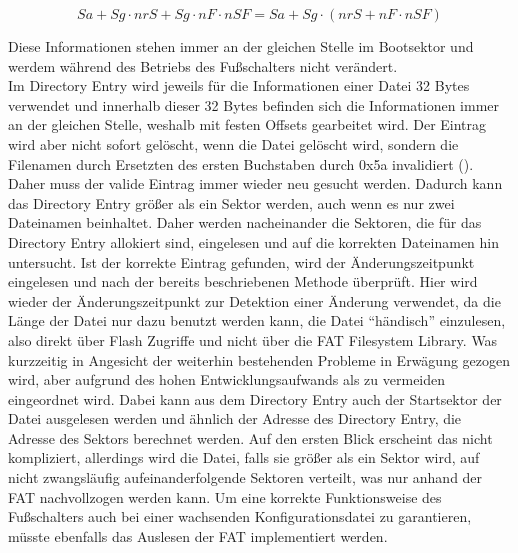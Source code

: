 \[Sa + Sg \cdot nrS + Sg \cdot nF \cdot nSF = Sa + Sg\cdot(nrS + nF \cdot nSF)\]

Diese Informationen stehen immer an der gleichen Stelle im Bootsektor und werdem während des Betriebs des Fußschalters nicht verändert. \\
Im Directory Entry wird jeweils für die Informationen einer Datei 32 Bytes verwendet und innerhalb dieser 32 Bytes befinden sich die Informationen immer an der gleichen Stelle, weshalb mit festen Offsets gearbeitet wird. Der Eintrag wird aber nicht sofort gelöscht, wenn die Datei gelöscht wird, sondern die Filenamen durch Ersetzten des ersten Buchstaben durch 0x5a invalidiert (\cite[Abschnitt 1.4]{FAT}). Daher muss der valide Eintrag immer wieder neu gesucht werden. Dadurch kann das Directory Entry größer als ein Sektor werden, auch wenn es nur zwei Dateinamen beinhaltet. Daher werden nacheinander die Sektoren, die für das Directory Entry allokiert sind, eingelesen und auf die korrekten Dateinamen hin untersucht. Ist der korrekte Eintrag gefunden, wird der Änderungszeitpunkt eingelesen und nach der bereits beschriebenen Methode überprüft. Hier wird wieder der Änderungszeitpunkt zur Detektion einer Änderung verwendet, da die Länge der Datei nur dazu benutzt werden kann, die Datei ``händisch'' einzulesen, also direkt über Flash Zugriffe und nicht über die \ac{FAT} Filesystem Library. Was kurzzeitig in Angesicht der weiterhin bestehenden Probleme in Erwägung gezogen wird, aber aufgrund des hohen Entwicklungsaufwands als zu vermeiden eingeordnet wird. Dabei kann aus dem Directory Entry auch der Startsektor der Datei ausgelesen werden und ähnlich der Adresse des Directory Entry, die Adresse des Sektors berechnet werden. Auf den ersten Blick erscheint das nicht kompliziert, allerdings wird die Datei, falls sie größer als ein Sektor wird, auf nicht zwangsläufig aufeinanderfolgende Sektoren verteilt, was nur anhand der \ac{FAT} nachvollzogen werden kann. Um eine korrekte Funktionsweise des Fußschalters auch bei einer wachsenden Konfigurationsdatei zu garantieren, müsste ebenfalls das Auslesen der \ac{FAT} implementiert werden.

